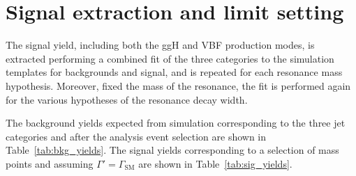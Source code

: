 \section{Signal extraction and limit setting}\label{chap6:SignalExtractionAndLimits}

The signal yield, including both the ggH and VBF production modes, is extracted performing a combined fit of the three categories to the \mti simulation templates for backgrounds and signal, and is repeated for each resonance mass hypothesis. Moreover, fixed the mass of the resonance, the fit is performed again for the various hypotheses of the resonance decay width.

The background yields expected from simulation corresponding to the three jet categories and after the analysis event selection are shown in Table~\ref{tab:bkg_yields}. The signal yields corresponding to a selection of mass points and assuming $\Gamma' = \Gamma_\mathrm{SM}$ are shown in Table~\ref{tab:sig_yields}.

